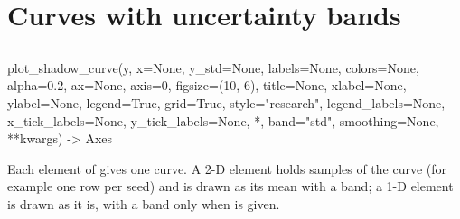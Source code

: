 \section{Curves with uncertainty bands}\label{sec:plotkit-curves}

\subsection{\texorpdfstring{}{plot\_shadow\_curve}}

\begin{pycode}
plot_shadow_curve(y, x=None, y_std=None, labels=None, colors=None, alpha=0.2,
                  ax=None, axis=0, figsize=(10, 6), title=None, xlabel=None,
                  ylabel=None, legend=True, grid=True, style="research",
                  legend_labels=None, x_tick_labels=None, y_tick_labels=None,
                  *, band="std", smoothing=None, **kwargs) -> Axes
\end{pycode}

Each element of  gives one curve. A 2-D element holds samples of the
curve (for example one row per seed) and is drawn as its mean with a band; a
1-D element is drawn as it is, with a band only when  is given.

